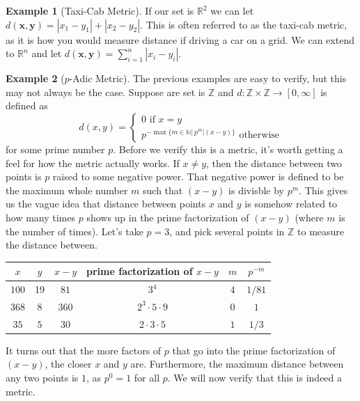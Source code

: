 \documentclass{article}
\newcommand{\N}{\mathbb{N}}
\newcommand{\R}{\mathbb{R}}
\newcommand{\Z}{\mathbb{Z}}
\theoremstyle{definition}
\newtheorem{example}{Example}[section]
\begin{document}
	\begin{example}[Taxi-Cab Metric]
		If our set is $ \R^2 $ we can let $ d(\mathbf{x},\mathbf{y})=|x_1-y_1|+|x_2-y_2| $. This is often referred to as the taxi-cab metric, as it is how you would measure distance if driving a car on a grid. We can extend to $ \R^n $ and let $ d(\mathbf{x},\mathbf{y})=\sum_{i=1}^{n}|x_i-y_i| $. 
	\end{example}
	\begin{example}[$ p $-Adic Metric]
		The previous examples are easy to verify, but this may not always be the case. Suppose are set is $ \Z $ and $ d:\Z\times\Z\to[0,\infty] $ is defined as $$ d(x,y)=\begin{cases}
			0\text{ if }x=y\\p^{-\max\{m\in\N|\ p^m|(x-y) \}}\text{ otherwise}
		\end{cases}$$ for some prime number $ p $. Before we verify this is a metric, it's worth getting a feel for how the metric actually works. If $ x\neq y $, then the distance between two points is $ p $ raised to some negative power. That negative power is defined to be the maximum whole number $ m $ such that $ (x-y) $ is divisble by $ p^m $. This gives us the vague idea that distance between points $ x $ and $ y $ is somehow related to how many times $ p $ shows up in the prime factorization of $ (x-y) $ (where $ m $ is the number of times). Let's take $ p=3 $, and pick several points in $ \Z $ to measure the distance between.    
		\begin{center}
			\begin{tabular}{cccccc}
				$ x $ & $ y $ & $ x-y $ & prime factorization of $ x-y $ & $ m $ & $ p^{-m} $ \\ \hline
				$ 100 $& 19  &  $ 81 $   &          $ 3^4 $                  &  $ 4 $  &     $ 1/81 $                  \\
				$ 368 $	& 8  &  $ 360 $   &            $ 2^3\cdot5\cdot9 $                &  $ 0 $  &  $ 1 $                     \\
				$ 35 $	& $ 5 $  &  $ 30 $   &  $ 2\cdot 3\cdot 5 $                           &      $ 1 $ & $ 1/3 $                 
			\end{tabular}
		\end{center}
		It turns out that the more factors of $ p $ that go into the prime factorization of $ (x-y)$, the closer $ x $ and $ y $ are. Furthermore, the maximum distance between any two points is $ 1 $, as $ p^0=1 $ for all $ p $. We will now verify that this is indeed a metric. 
		\begin{enumerate}

\end{enumerate}
\end{example}
\end{document}

